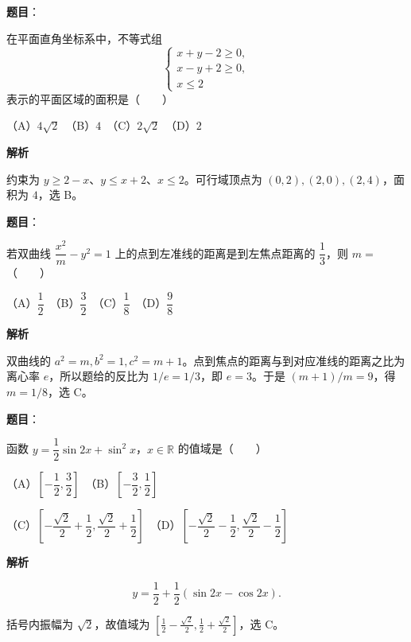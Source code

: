 \begin{answer}

\textbf{题目}：

在平面直角坐标系中，不等式组
\nopagebreak[4]
\[
\begin{cases}
x+y-2\geqslant0,\\
x-y+2\geqslant0,\\
x\leqslant2
\end{cases}
\]
表示的平面区域的面积是\mbox{（　　）}

（A）$4\sqrt2$　（B）$4$　（C）$2\sqrt2$　（D）$2$

\textbf{解析}

约束为 $y\ge2-x$、$y\le x+2$、$x\le2$。可行域顶点为 $(0,2),(2,0),(2,4)$，面积为 $4$，选 B。


\end{answer}
\begin{answer}

\textbf{题目}：

若双曲线 $\dfrac{x^2}{m}-y^2=1$ 上的点到左准线的距离是到左焦点距离的 $\dfrac13$，则 $m=$\mbox{（　　）}

（A）$\dfrac12$　（B）$\dfrac32$　（C）$\dfrac18$　（D）$\dfrac98$

\textbf{解析}

双曲线的 $a^2=m,b^2=1,c^2=m+1$。点到焦点的距离与到对应准线的距离之比为离心率 $e$，所以题给的反比为 $1/e=1/3$，即 $e=3$。于是 $(m+1)/m=9$，得 $m=1/8$，选 C。


\end{answer}
\begin{answer}

\textbf{题目}：

函数 $y=\dfrac12\sin2x+\sin^2x$，$x\in\mathbb R$ 的值域是\mbox{（　　）}

（A）$\left[-\dfrac12,\dfrac32\right]$　（B）$\left[-\dfrac32,\dfrac12\right]$

（C）$\left[-\dfrac{\sqrt2}{2}+\dfrac12,\dfrac{\sqrt2}{2}+\dfrac12\right]$　（D）$\left[-\dfrac{\sqrt2}{2}-\dfrac12,\dfrac{\sqrt2}{2}-\dfrac12\right]$

\textbf{解析}

\nopagebreak[4]
\[
y=\frac12+\frac12(\sin2x-\cos2x).
\]

括号内振幅为 $\sqrt2$，故值域为 $[\frac12-\frac{\sqrt2}{2},\frac12+\frac{\sqrt2}{2}]$，选 C。


\end{answer}
